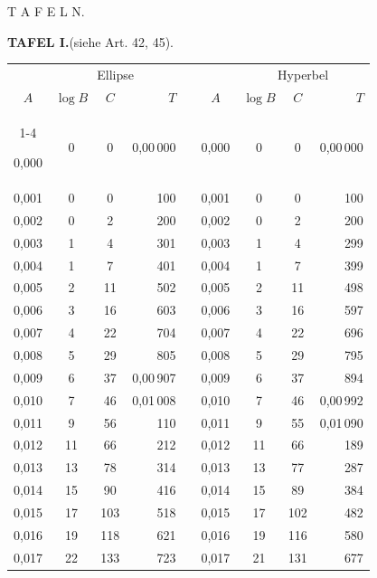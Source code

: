 \clearpage
{}
\thispagestyle{empty}
\vspace*{2.5in}
\begin{center}{\Large T A F E L N.}\end{center}
\clearpage
{}
\begingroup
\centering
\fontsize{9}{9}\selectfont
\setlength{\tabcolsep}{6pt}
\renewcommand{\arraystretch}{1}
\setlength{\parskip}{0pt}
\textbf{TAFEL I.}\quad (siehe Art. 42, 45).
\par\vspace{7pt}
\begin{tabular}{|c|c|c|r|@{}p{9pt}@{}|c|c|c|r|}
\hline
\rule{0pt}{8.5pt} & \multicolumn{3}{c|}{Ellipse} & & & \multicolumn{3}{c|}{Hyperbel} \\
\(A\) & \(\log B\) & \(C\) & \(T\) & & \(A\) & \(\log B\) & \(C\) & \(T\) \\
\cline{1-4}\cline{6-9}
\rule{0pt}{8.5pt}0,000 & 0 & 0 & 0,00\,000 &  & 0,000 & 0 & 0 & 0,00\,000 \\
0,001 & 0 & 0 & 100 &  & 0,001 & 0 & 0 & 100 \\
0,002 & 0 & 2 & 200 &  & 0,002 & 0 & 2 & 200 \\
0,003 & 1 & 4 & 301 &  & 0,003 & 1 & 4 & 299 \\
0,004 & 1 & 7 & 401 &  & 0,004 & 1 & 7 & 399 \\
0,005 & 2 & 11 & 502 &  & 0,005 & 2 & 11 & 498 \\[3pt]
0,006 & 3 & 16 & 603 &  & 0,006 & 3 & 16 & 597 \\
0,007 & 4 & 22 & 704 &  & 0,007 & 4 & 22 & 696 \\
0,008 & 5 & 29 & 805 &  & 0,008 & 5 & 29 & 795 \\
0,009 & 6 & 37 & 0,00\,907 &  & 0,009 & 6 & 37 & 894 \\
0,010 & 7 & 46 & 0,01\,008 &  & 0,010 & 7 & 46 & 0,00\,992 \\[3pt]
0,011 & 9 & 56 & 110 &  & 0,011 & 9 & 55 & 0,01\,090 \\
0,012 & 11 & 66 & 212 &  & 0,012 & 11 & 66 & 189 \\
0,013 & 13 & 78 & 314 &  & 0,013 & 13 & 77 & 287 \\
0,014 & 15 & 90 & 416 &  & 0,014 & 15 & 89 & 384 \\
0,015 & 17 & 103 & 518 &  & 0,015 & 17 & 102 & 482 \\[3pt]
0,016 & 19 & 118 & 621 &  & 0,016 & 19 & 116 & 580 \\
0,017 & 22 & 133 & 723 &  & 0,017 & 21 & 131 & 677 \\

\end{tabular}
